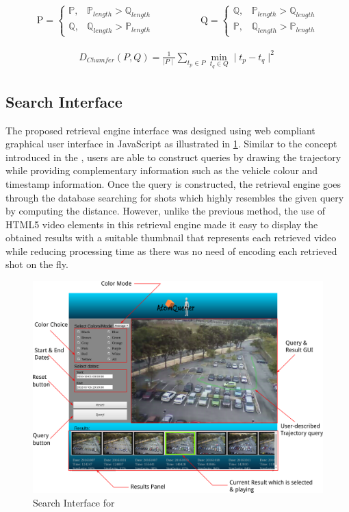\begin{align}
\mathrm{P} =\begin{cases}
\mathbb{P}, & \mathbb{P}_{length} > \mathbb{Q}_{length} \\
\mathbb{Q}, & \mathbb{Q}_{length} > \mathbb{P}_{length}
\end{cases}   \hspace{2em}  &  \hspace{2em}
\mathrm{Q} =\begin{cases}
\mathbb{Q}, & \mathbb{P}_{length} > \mathbb{Q}_{length} \\
\mathbb{P}, & \mathbb{Q}_{length} > \mathbb{P}_{length}
\end{cases}
\end{align}


\begin{align}
\label{eq:chamferDistance}
D_{Chamfer} (P,Q) = \frac{1}{\mid P \mid} \sum_{t_p \in P} \min_{t_q \in Q}  \mid t_p - t_q \mid^{2}
\end{align}

\subsection{Search Interface}
The proposed retrieval engine interface was designed using web compliant
graphical user interface in JavaScript as illustrated in
\ref{fig:versionTwoInterface}.
Similar to the concept introduced in the \versionOneRet, users are able to
construct queries by drawing the trajectory while providing complementary
information such as the vehicle colour and timestamp information.
Once the query is constructed, the retrieval engine goes through the database
searching for shots which highly resembles the given query by computing the
distance.
However, unlike the previous method, the use of HTML5 video elements in this
retrieval engine made it easy to display the obtained results with a suitable
thumbnail that represents each retrieved video while reducing processing time
as there was no need of encoding each retrieved shot on the fly.

\begin{figure}[!hbt]\centering
\includegraphics[width=.9\textwidth]{image/retrievalTwo/VISERinterface2.png}
\caption{Search Interface for \versionTwoRet}
\label{fig:versionTwoInterface}
\end{figure}

